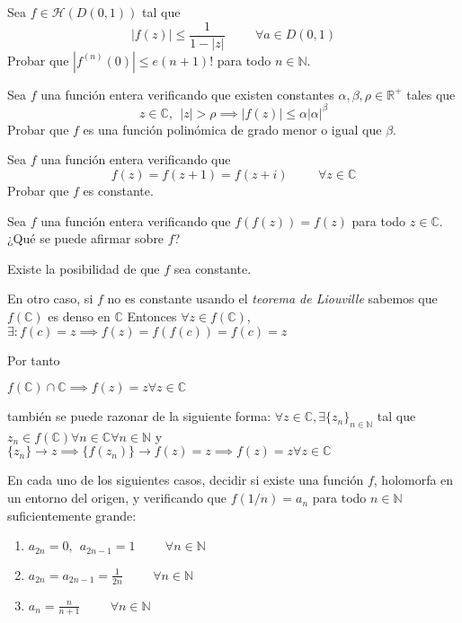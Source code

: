 \begin{ejer}
	Sea $f\in\mathcal{H}(D(0,1))$ tal que
	$$ |f(z)| \leq \frac{1}{1-|z|} \hspace{1cm} \forall a\in D(0,1) $$
	Probar que $|f^{(n)}(0)| \leq e(n+1)!$ para todo $n\in\mathbb{N}$.
\end{ejer}

\begin{ejer}
	Sea $f$ una función entera verificando que existen constantes $\alpha,\beta,\rho\in\mathbb{R}^+$ tales que
	$$ z\in\mathbb{C}, \ \ |z|>\rho \implies |f(z)| \leq \alpha |\alpha|^{\beta} $$
	Probar que $f$ es una función polinómica de grado menor o igual que $\beta$.
\end{ejer}

\begin{ejer}
	Sea $f$ una función entera verificando que
	$$ f(z) = f(z+1)=f(z+i) \hspace{1cm} \forall z\in\mathbb{C} $$
	Probar que $f$ es constante.
\end{ejer}

\begin{ejer}
	Sea $f$ una función entera verificando que $f(f(z))=f(z)$ para todo $z\in\mathbb{C}$. ¿Qué se puede afirmar sobre $f$?
\end{ejer}
Existe la posibilidad de que $f$ sea constante.

En otro caso, si $f$ no es constante usando el \textit{teorema de Liouville} sabemos que $f(\mathbb{C})$ es denso en $\mathbb{C}$
Entonces
$\forall z\in f(\mathbb{C})$, $\exists  : f(c)=z \implies f(z) = f(f(c)) = f(c) = z$


Por tanto

$f(\mathbb{C}) \cap \mathbb{C} \implies f(z)=z \forall z\in \mathbb{C}$

también se puede razonar de la siguiente forma:
$\forall z\in\mathbb{C}, \exists \{z_n\}_{n\in\mathbb{N}}$ tal que 
$z_n\in f(\mathbb{C}) \forall n\in\mathbb{C} \forall n\in\mathbb{N}$ y $\{z_n\}\rightarrow z \implies \{f(z_n)\}\rightarrow f(z)=z \implies f(z)=z \forall z\in\mathbb{C}$

\begin{ejer}
	En cada uno de los siguientes casos, decidir si existe una función $f$, holomorfa en un entorno del origen, y verificando que $f(1/n)=a_n$ para todo $n\in\mathbb{N}$ suficientemente grande:
	\begin{enumerate}[label=(\alph*)]
		\item $a_{2n} = 0, \ \ a_{2n-1}=1 \hspace{1cm} \forall n\in\mathbb{N}$
		\item $a_{2n} = a_{2n-1} = \frac{1}{2n} \hspace{1cm} \forall n\in\mathbb{N}$
		\item $a_n = \frac{n}{n+1} \hspace{1cm} \forall n\in\mathbb{N}$
	\end{enumerate}
\end{ejer}

